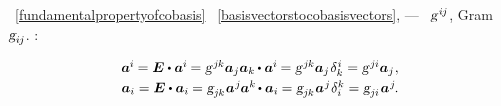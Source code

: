 \begin{otherlanguage}{russian}
\vspace{-0.2em}
~\eqref{fundamentalpropertyofcobasis}
~\eqref{basisvectorstocobasisvectors},
\:---
~\hbox{$\textsl{g}^{\hspace{.2ex}i\hspace{-0.1ex}j}$\hspace{-0.3ex}},
Gram~${\textsl{g}_{i\hspace{-0.1ex}j}}$.
\::

\nopagebreak\vspace{-0.12em}
\begin{equation}\begin{array}{c}
\bm{a}^{\hspace{-0.05ex}i} \hspace{-0.1ex}
= \UnitDyad \dotp \bm{a}^{\hspace{-0.05ex}i} \hspace{-0.15ex}
= \textsl{g}^{\hspace{.2ex}j\hspace{-0.1ex}k} \bm{a}_j \bm{a}_k \hspace{-0.1ex} \dotp \bm{a}^{\hspace{-0.05ex}i} \hspace{-0.15ex}
= \textsl{g}^{\hspace{.2ex}j\hspace{-0.1ex}k} \bm{a}_j \hspace{.16ex} \delta_{k}^{\hspace{.1ex}i}
= \textsl{g}^{\hspace{.2ex}j\hspace{-0.06ex}i} \bm{a}_j \hspace{.1ex} ,
\\[.25em]
%
\bm{a}_i
= \UnitDyad \dotp \bm{a}_i \hspace{-0.1ex}
= \textsl{g}_{j\hspace{-0.1ex}k} \hspace{.1ex} \bm{a}^{\hspace{.1ex}j} \hspace{-0.1ex} \bm{a}^{k} \hspace{-0.2ex} \dotp \bm{a}_i \hspace{-0.1ex}
= \textsl{g}_{j\hspace{-0.1ex}k} \hspace{.1ex} \bm{a}^{\hspace{.1ex}j} \hspace{.1ex} \delta_{i}^{k}
= \textsl{g}_{j\hspace{-0.06ex}i} \hspace{.16ex} \bm{a}^{\hspace{.1ex}j} \hspace{-0.2ex} .
\end{array}\end{equation}


\end{otherlanguage}

